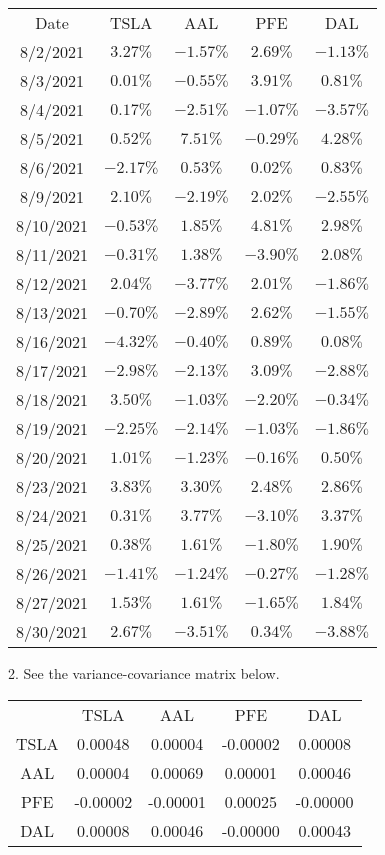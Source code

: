 \documentclass[12pt]{article}
\begin{document}
\begin{center}
\begin{tabular}{c|c|c|c|c}
Date&TSLA&AAL&PFE&DAL\\
8/2/2021&$3.27\%$&$-1.57\%$&$2.69\%$&$-1.13\%$\\
8/3/2021&$0.01\%$&$-0.55\%$&$3.91\%$&$0.81\%$\\
8/4/2021&$0.17\%$&$-2.51\%$&$-1.07\%$&$-3.57\%$\\
8/5/2021&$0.52\%$&$7.51\%$&$-0.29\%$&$4.28\%$\\
8/6/2021&$-2.17\%$&$0.53\%$&$0.02\%$&$0.83\%$\\
8/9/2021&$2.10\%$&$-2.19\%$&$2.02\%$&$-2.55\%$\\
8/10/2021&$-0.53\%$&$1.85\%$&$4.81\%$&$2.98\%$\\
8/11/2021&$-0.31\%$&$1.38\%$&$-3.90\%$&$2.08\%$\\
8/12/2021&$2.04\%$&$-3.77\%$&$2.01\%$&$-1.86\%$\\
8/13/2021&$-0.70\%$&$-2.89\%$&$2.62\%$&$-1.55\%$\\
8/16/2021&$-4.32\%$&$-0.40\%$&$0.89\%$&$0.08\%$\\
8/17/2021&$-2.98\%$&$-2.13\%$&$3.09\%$&$-2.88\%$\\
8/18/2021&$3.50\%$&$-1.03\%$&$-2.20\%$&$-0.34\%$\\
8/19/2021&$-2.25\%$&$-2.14\%$&$-1.03\%$&$-1.86\%$\\
8/20/2021&$1.01\%$&$-1.23\%$&$-0.16\%$&$0.50\%$\\
8/23/2021&$3.83\%$&$3.30\%$&$2.48\%$&$2.86\%$\\
8/24/2021&$0.31\%$&$3.77\%$&$-3.10\%$&$3.37\%$\\
8/25/2021&$0.38\%$&$1.61\%$&$-1.80\%$&$1.90\%$\\
8/26/2021&$-1.41\%$&$-1.24\%$&$-0.27\%$&$-1.28\%$\\
8/27/2021&$1.53\%$&$1.61\%$&$-1.65\%$&$1.84\%$\\
8/30/2021&$2.67\%$&$-3.51\%$&$0.34\%$&$-3.88\%$\\
\end{tabular}
\end{center}
2. See the variance-covariance matrix below.
\begin{center}
\begin{tabular}{c|c|c|c|c}
&TSLA&AAL&PFE&DAL\\
TSLA&0.00048&0.00004&-0.00002&0.00008\\
AAL&0.00004&0.00069&0.00001&0.00046\\
PFE&-0.00002&-0.00001&0.00025&-0.00000\\
DAL&0.00008&0.00046&-0.00000&0.00043
\end{tabular}
\end{center}
\end{document}
